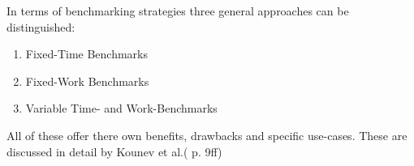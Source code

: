 \documentclass[	runningheads,
				a4paper]{llncs}
\begin{document}


In terms of benchmarking strategies three general approaches can be distinguished:
\begin{enumerate}
	\item Fixed-Time Benchmarks
	\item Fixed-Work Benchmarks
	\item Variable Time- and Work-Benchmarks
\end{enumerate}

All of these offer there own benefits, drawbacks and specific use-cases. These are discussed in detail by Kounev et al.(\cite{Kounev} p. 9ff)




\end{document}
